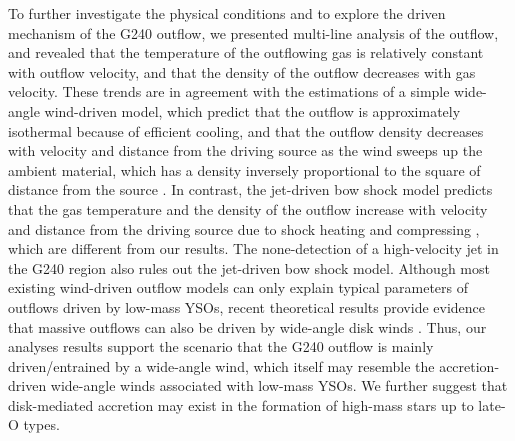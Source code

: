 To further investigate the physical conditions and to explore the driven mechanism of the G240 outflow, we presented multi-line analysis of the outflow, and revealed that the temperature of the outflowing gas is relatively constant with outflow velocity, and that the density of the outflow decreases with gas velocity. These trends are in agreement with the estimations of a simple wide-angle wind-driven model, which predict that the outflow is approximately isothermal because of efficient cooling, and that the outflow density decreases with velocity and distance from the driving source as the wind sweeps up the ambient material, which has a density inversely proportional to the square of distance from the source \citep{1991ApJ...370L..31S, 2001ApJ...557..429L}. In contrast, the jet-driven bow shock model predicts that the gas temperature and the density of the outflow increase with velocity and distance from the driving source due to shock heating and compressing \citep{2001ApJ...557..429L}, which are different from our results. The none-detection of a high-velocity jet in the G240 region also rules out the jet-driven bow shock model. Although most existing wind-driven outflow models can only explain typical parameters of outflows driven by low-mass YSOs, recent theoretical results provide evidence that massive outflows can also be driven by wide-angle disk winds \citep{2018MNRAS.475..391M}. Thus, our analyses results support the scenario that the G240 outflow is mainly driven/entrained by a wide-angle wind, which itself may resemble the accretion-driven wide-angle winds \citep[X-wind or disk winds:][]{2006ApJ...649..845S, 2006MNRAS.365.1131P} associated with low-mass YSOs. We further suggest that disk-mediated accretion may exist in the formation of high-mass stars up to late-O types. 
